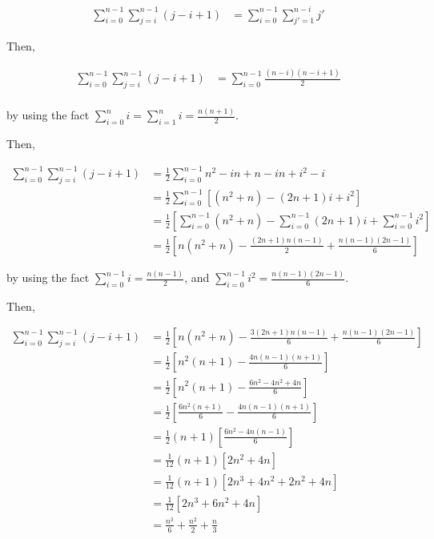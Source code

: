 \documentclass[12pt]{article}
\begin{document}
\begin{itemize}
    \begin{align}
        \sum\limits_{i=0}^{n-1} \sum\limits_{j=i}^{n-1} (j - i + 1) &= \sum\limits_{i=0}^{n-1} \sum\limits_{j'=1}^{n-i} j'
    \end{align}

    \bigskip

    Then,

    \begin{align}
        \sum\limits_{i=0}^{n-1} \sum\limits_{j=i}^{n-1} (j - i + 1) &= \sum\limits_{i=0}^{n-1} \frac{(n-i)(n-i+ 1)}{2}\\
    \end{align}

    by using the fact $\sum\limits_{i=0}^{n} i = \sum\limits_{i=1}^n i = \frac{n(n+1)}{2}$.

    \bigskip

    Then,

    \begin{align}
        \sum\limits_{i=0}^{n-1} \sum\limits_{j=i}^{n-1} (j - i + 1) &= \frac{1}{2} \sum\limits_{i=0}^{n-1} n^2-in+n-in+i^2-i\\
        &= \frac{1}{2} \sum\limits_{i=0}^{n-1} \left[ (n^2 + n) - (2n + 1)i + i^2 \right]\\
        &= \frac{1}{2} \left[ \sum\limits_{i=0}^{n-1} (n^2 + n) - \sum\limits_{i=0}^{n-1}  (2n + 1)i + \sum\limits_{i=0}^{n-1} i^2 \right]\\
        &= \frac{1}{2} \left[ n(n^2 + n) - \frac{(2n+1)n(n-1)}{2} + \frac{n(n-1)(2n-1)}{6} \right]
    \end{align}

    by using the fact $\sum\limits_{i=0}^{n-1} i = \frac{n(n-1)}{2}$, and $\sum\limits_{i=0}^{n-1} i^2 = \frac{n(n-1)(2n-1)}{6}$.

    \bigskip

    Then,

    \begin{align}
        \sum\limits_{i=0}^{n-1} \sum\limits_{j=i}^{n-1} (j - i + 1) &= \frac{1}{2} \left[ n(n^2 + n) - \frac{3(2n+1)n(n-1)}{6} + \frac{n(n-1)(2n-1)}{6} \right]\\
        &= \frac{1}{2} \left[ n^2(n + 1) - \frac{4n(n-1)(n+1)}{6} \right]\\
        &= \frac{1}{2} \left[ n^2(n + 1) - \frac{6n^2 - 4n^2 + 4n}{6} \right]\\
        &= \frac{1}{2} \left[ \frac{6n^2(n + 1)}{6} - \frac{4n(n-1)(n+1)}{6} \right]\\
        &= \frac{1}{2} (n+1) \left[ \frac{6n^2 - 4n(n-1)}{6} \right]\\
        &= \frac{1}{12} (n+1) \left[ 2n^2 + 4n \right]\\
        &= \frac{1}{12} (n+1) \left[ 2n^3 + 4n^2 + 2n^2 + 4n \right]\\
        &= \frac{1}{12} \left[ 2n^3 + 6n^2 + 4n \right]\\
        &= \frac{n^3}{6} + \frac{n^2}{2} + \frac{n}{3}
    \end{align}

\end{itemize}
\end{document}
